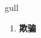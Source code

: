 
\begin{frame}
{\huge gull}
\begin{center}
\begin{enumerate}\Large
  \item \textbf{欺骗}
\end{enumerate}
\end{center}
\end{frame}
